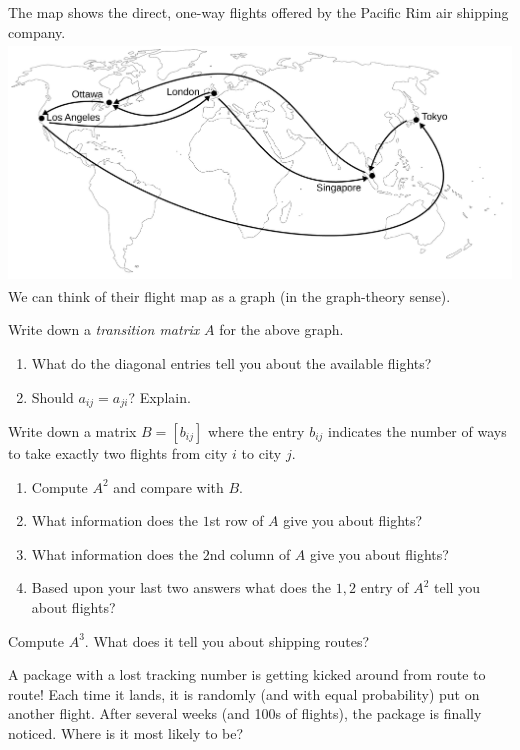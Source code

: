 	\question
	The map shows the direct, one-way flights offered by the Pacific
	Rim air shipping company.
	\includegraphics[height=2.5in]{images/flight_map.pdf}
	We can think of their flight map as a graph (in the graph-theory sense).


	\begin{parts}
		\item Write down a \emph{transition matrix} $A$ for the above graph.
		\begin{enumerate}
			\item What do the diagonal entries tell you about the available flights?
			\item Should $a_{ij} = a_{ji}$? Explain.
		\end{enumerate}
		\item Write down a matrix $B=[b_{ij}]$ where the entry $b_{ij}$ indicates the 
		number of ways to take exactly two flights from city $i$ to city $j$.
		\begin{enumerate}
			\item Compute $A^2$ and compare with $B$.
			\item What information does the $1$st row of $A$ give you about flights?
			\item What information does the $2$nd column of $A$ give you about 
			flights?
			\item Based upon your last two answers what does the $1,2$ entry of 
			$A^2$ tell you about flights?
		\end{enumerate}
		\item Compute $A^3$. What does it tell you about shipping routes?
		\item A package with a lost tracking number is getting kicked around from route to route!
			Each time it lands, it is randomly (and with equal probability)
			put on another flight.
			After several weeks (and 100s of flights), the package is finally noticed.
				Where is it most likely to be?
	\end{parts}



